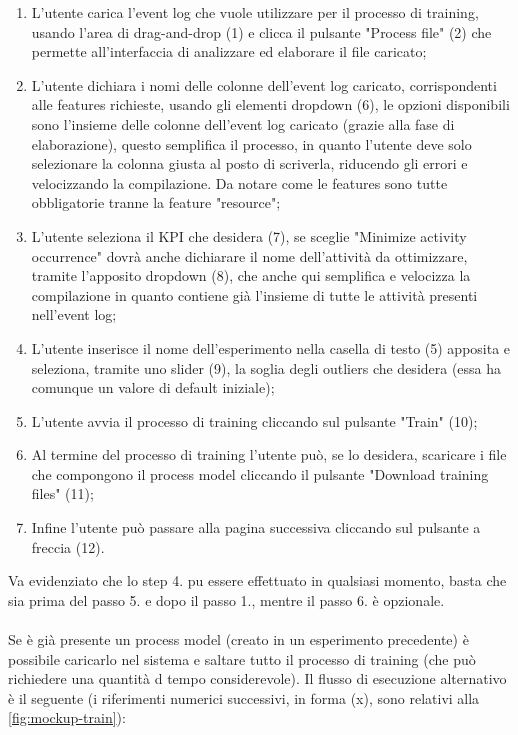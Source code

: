 \begin{enumerate}
\item L'utente carica l'event log che vuole utilizzare per il processo di training, usando l'area di drag-and-drop (1) e clicca il pulsante "Process file" (2) che permette all'interfaccia di analizzare ed elaborare il file caricato;

\item L'utente dichiara i nomi delle colonne dell'event log caricato, corrispondenti alle features richieste, usando gli elementi dropdown (6), le opzioni disponibili sono l'insieme delle colonne dell'event log caricato (grazie alla fase di elaborazione), questo semplifica il processo, in quanto l'utente deve solo selezionare la colonna giusta al posto di scriverla, riducendo gli errori e velocizzando la compilazione. Da notare come le features sono tutte obbligatorie tranne la feature "resource";

\item L'utente seleziona il KPI che desidera (7), se sceglie "Minimize activity occurrence" dovrà anche dichiarare il nome dell'attività da ottimizzare, tramite l'apposito dropdown (8), che anche qui semplifica e velocizza la compilazione in quanto contiene già l'insieme di tutte le attività presenti nell'event log;

\item L'utente inserisce il nome dell'esperimento nella casella di testo (5) apposita e seleziona, tramite uno slider (9), la soglia degli outliers che desidera (essa ha comunque un valore di default iniziale);

\item L'utente avvia il processo di training cliccando sul pulsante "Train" (10);

\item Al termine del processo di training l'utente può, se lo desidera, scaricare i file che compongono il process model cliccando il pulsante "Download training files" (11); 

\item Infine l'utente può passare alla pagina successiva cliccando sul pulsante a freccia (12).

\end{enumerate}

Va evidenziato che lo step 4. pu essere effettuato in qualsiasi momento, basta che sia prima del passo 5. e dopo il passo 1., mentre il passo 6. è opzionale. 
\\ \\
Se è già presente un process model (creato in un esperimento precedente) è possibile caricarlo nel sistema e saltare tutto il processo di training (che può richiedere una quantità d tempo considerevole). Il flusso di esecuzione alternativo è il seguente (i riferimenti numerici successivi, in forma (x), sono relativi alla \autoref{fig:mockup-train}):

